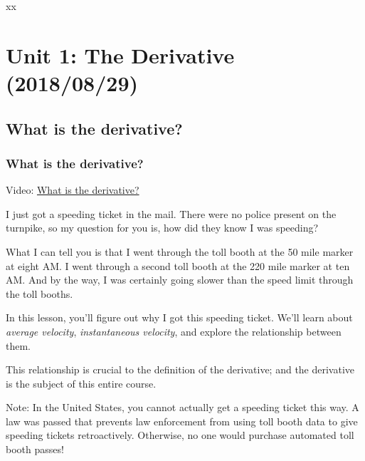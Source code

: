 \documentclass[pdftex, brazil, 12pt, twoside]{article}
\begin{document}
xx




\newpage
\section{Unit 1: The Derivative (2018/08/29)}
\label{u1}


\subsection{What is the derivative?}
\label{u1-what}

\subsubsection{What is the derivative?}
\label{u1-what-what}

Video: \href{https://www.youtube.com/watch?v=MCxsXQKNd-U}{What is the derivative?}

I just got a speeding ticket in the mail.
There were no police present on the turnpike, so my question for you is, how did
they know I was speeding?

What I can tell you is that I went
through the toll booth at the 50 mile marker at eight AM.
I went through a second toll booth at the 220 mile marker
at ten AM.
And by the way, I was certainly going slower than the speed
limit through the toll booths.

In this lesson, you'll figure out
why I got this speeding ticket.
We'll learn about \emph{average velocity},
\emph{instantaneous velocity}, and explore
the relationship between them.

This relationship is crucial to the definition
of the derivative; and the derivative
is the subject of this entire course.

Note: In the United States, you cannot actually get a speeding ticket this way.
A law was passed that prevents law enforcement from using toll booth data to give
speeding tickets retroactively. Otherwise, no one would purchase automated
toll booth passes!
\end{document}
